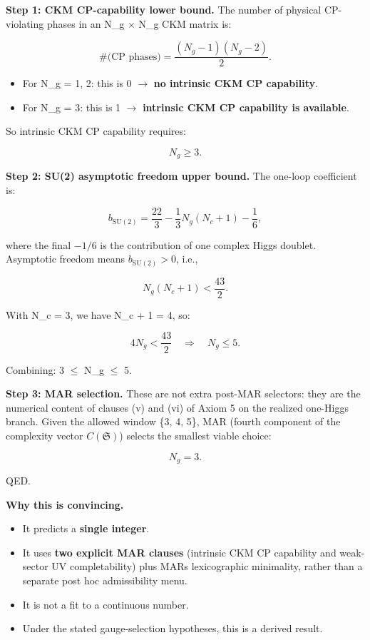 \textbf{Step 1: CKM CP-capability lower bound.} The number of physical CP-violating phases in an N\_g \ensuremath{\times} N\_g CKM matrix is:

\[
\#\text{(CP phases)} = \frac{(N_g - 1)(N_g - 2)}{2}.
\]

\begin{itemize}
\tightlist
\item
  For N\_g = 1, 2: this is 0 \ensuremath{\to} \textbf{no intrinsic CKM CP capability}.
\item
  For N\_g = 3: this is 1 \ensuremath{\to} \textbf{intrinsic CKM CP capability is available}.
\end{itemize}

So intrinsic CKM CP capability requires:

\[
N_g \ge 3.
\]

\textbf{Step 2: SU(2) asymptotic freedom upper bound.} The one-loop coefficient is:

\[
b_{\mathrm{SU}(2)} = \frac{22}{3} - \frac{1}{3}N_g(N_c + 1) - \frac{1}{6},
\]

where the final \(-1/6\) is the contribution of one complex Higgs doublet. Asymptotic freedom means \(b_{\mathrm{SU}(2)} > 0\), i.e.,

\[
N_g(N_c + 1) < \frac{43}{2}.
\]

With N\_c = 3, we have N\_c + 1 = 4, so:

\[
4 N_g < \frac{43}{2} \quad \Rightarrow \quad N_g \le 5.
\]

Combining: 3 \ensuremath{\leq} N\_g \ensuremath{\leq} 5.

\textbf{Step 3: MAR selection.} These are not extra post-MAR selectors: they are the numerical content of clauses (v) and (vi) of Axiom 5 on the realized one-Higgs branch. Given the allowed window \{3, 4, 5\}, MAR (fourth component of the complexity vector \(C(\mathfrak S)\)) selects the smallest viable choice:

\[
N_g = 3.
\]

QED.

\textbf{Why this is convincing.}

\begin{itemize}
\tightlist
\item
  It predicts a \textbf{single integer}.
\item
  It uses \textbf{two explicit MAR clauses} (intrinsic CKM CP capability and weak-sector UV completability) plus MAR\textquotesingle s lexicographic minimality, rather than a separate post hoc admissibility menu.
\item
  It is not a fit to a continuous number.
\item
  Under the stated gauge-selection hypotheses, this is a derived result.
\end{itemize}

